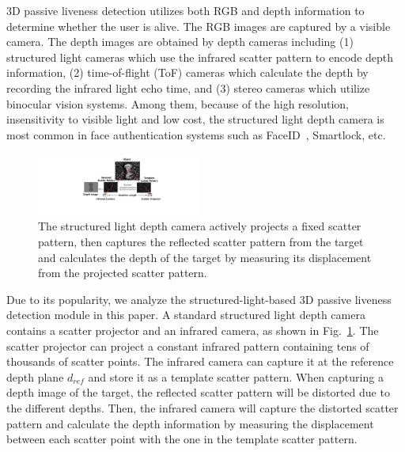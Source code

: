 3D passive liveness detection utilizes both RGB and depth information to determine whether the user is alive.  The RGB images are captured by a visible camera. The depth images are obtained by depth cameras including (1) structured light cameras which use the infrared scatter pattern to encode depth information, (2) time-of-flight (ToF) cameras which calculate the depth by recording the infrared light echo time, and (3) stereo cameras which utilize binocular vision systems. Among them, because of the high resolution, insensitivity to visible light and low cost, the structured light depth camera is most common in face authentication systems such as FaceID~\cite{han2007face,bud2018facing}, Smartlock\cite{waseem2020face}, etc.

\begin{figure}[pt] 
	\centerline{\includegraphics[width = 0.48\textwidth]{figures/structured_light_camera.pdf}}
	\vspace{-0.1in}
	\caption{The structured light depth camera actively projects a fixed scatter pattern, then captures the reflected scatter pattern from the target and calculates the depth of the target by measuring its displacement from the projected scatter pattern. }
	\label{depth_camera}
	\vspace{-0.15in}
\end{figure}

Due to its popularity, we analyze the structured-light-based 3D passive liveness detection module in this paper.
A standard structured light depth camera contains a scatter projector and an infrared camera, as shown in Fig.~\ref{depth_camera}. The scatter projector can project a  constant infrared pattern containing tens of thousands of scatter points. The infrared camera can capture it at the reference depth plane $d_{ref}$ and store it as a template scatter pattern. 
When capturing a depth image of the target, the reflected scatter pattern will be distorted due to the different depths. Then, the infrared camera will capture the distorted scatter pattern and calculate the depth information by measuring the displacement between each scatter point with the one in the template scatter pattern.


